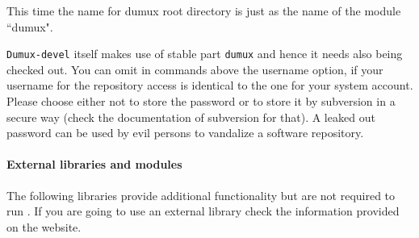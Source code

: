 This time the name for dumux root directory is just as the name of the module ``dumux".

\texttt{Dumux-devel} itself makes use of stable part \texttt{dumux} and hence it needs also being checked out. 
You can omit in commands above the username option, if your username for the repository access is identical to the one for your system account.
Please choose either not to store the password or to store it by subversion in a secure way (check the documentation of subversion for that). 
A leaked out password can be used by evil persons to vandalize a software repository.

\paragraph{External libraries and modules}

The following libraries provide additional functionality but are not required to run \Dumux. 
If you are going to use an external library check the information provided on the \Dune website.

